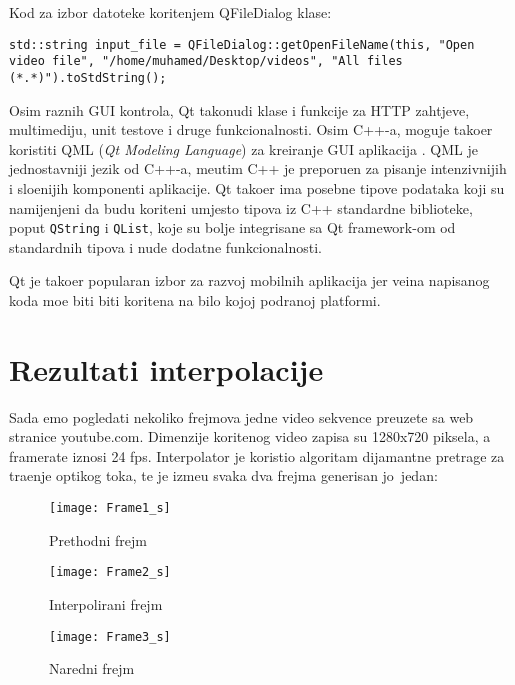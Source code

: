 Kod za izbor datoteke kori\sh tenjem QFileDialog klase:
\begin{lstlisting}
std::string input_file = QFileDialog::getOpenFileName(this, "Open video file", "/home/muhamed/Desktop/videos", "All files (*.*)").toStdString();
\end{lstlisting}

Osim raznih GUI kontrola, Qt tako\dj nudi klase i funkcije za HTTP zahtjeve, multimediju, unit testove i druge funkcionalnosti. Osim C++-a, mogu\cj je tako\dj er koristiti QML (\textit{Qt Modeling Language})
za kreiranje GUI aplikacija \cite{qtabout}. QML je jednostavniji jezik od C++-a, me\dj utim C++ je preporu\ch en za pisanje intenzivnijih i slo\zh enijih komponenti aplikacije. Qt tako\dj er ima posebne tipove
podataka koji su namijenjeni da budu kori\sh teni umjesto tipova iz C++ standardne biblioteke, poput \lstinline{QString} i \lstinline{QList}, koje su bolje integrisane sa Qt framework-om od standardnih tipova 
i nude dodatne funkcionalnosti.

Qt je tako\dj er popularan izbor za razvoj mobilnih aplikacija jer ve\cj ina napisanog koda mo\zh e biti biti kori\sh tena na bilo kojoj podr\zh anoj platformi.

\section{Rezultati interpolacije}
Sada \cj emo pogledati nekoliko frejmova jedne video sekvence preuzete sa web stranice youtube.com\cite{examplevideo}. 
Dimenzije kori\sh tenog video zapisa su 1280x720 piksela, a framerate iznosi 24 fps.
Interpolator je koristio algoritam dijamantne pretrage za tra\zh enje opti\ch kog toka, te je izme\dj u svaka dva frejma generisan jo\sh\ jedan:

\begin{figure}[H]
\caption{Prethodni frejm}
\texttt{[image: Frame1\_s]}
\centering
\end{figure}

\begin{figure}[H]
\caption {Interpolirani frejm}
\texttt{[image: Frame2\_s]}
\centering
\end{figure}

\begin{figure}[H]
\caption{Naredni frejm}
\texttt{[image: Frame3\_s]}
\centering
\end{figure}


